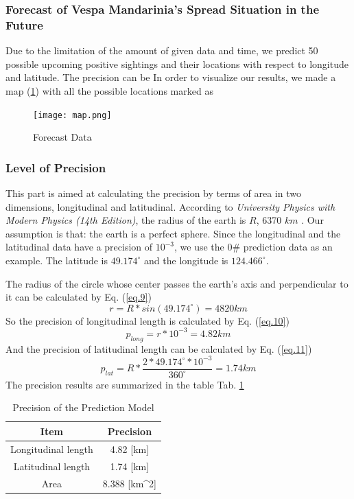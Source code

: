 \documentclass{mcmthesis}
\begin{document}
\subsubsection{Forecast of Vespa Mandarinia's Spread Situation in the Future}
Due to the limitation of the amount of given data and time, we predict 50 possible upcoming positive sightings and their locations with respect to longitude and latitude. The precision can be 
In order to visualize our results, we made a map (\ref{fig:map}) with all the possible locations marked as
\begin{figure}[!htbp]
	\centering
 	\texttt{[image: map.png]} 
	\caption{Forecast Data}
	\label{fig:map}
\end{figure}
\subsubsection{Level of Precision}
This part is aimed at calculating the precision by terms of area in two dimensions, longitudinal and latitudinal. According to \textit{University Physics with Modern Physics (14th Edition)}, the radius of the earth is $R$, 6370 $km$ \cite{RN2}. Our assumption is that: the earth is a perfect sphere. Since the longitudinal and the latitudinal data have a precision of $10^{-3}$, we use the 0\# prediction data as an example. The latitude is $49.174^\circ$ and the longitude is $124.466^\circ$. 

The radius of the circle whose center passes the earth's axis and perpendicular to it can be calculated by Eq. (\ref{eq.9})
\begin{equation}
	r=R*sin(49.174^\circ)=4820km
	\label{eq.9}
\end{equation}
So the precision of longitudinal length is calculated by Eq. (\ref{eq.10})
\begin{equation}
	p_{long}=r*10^{-3}=4.82km
	\label{eq.10}
\end{equation}
And the precision of latitudinal length can be calculated by Eq. (\ref{eq.11})
\begin{equation}
	p_{lat}=R*\frac{2*49.174^\circ*10^{-3}}{360^\circ}=1.74km
	\label{eq.11}
\end{equation}
The precision results are summarized in the table Tab. \ref{tab:3}
\begin{table}[htbp]
\centering
\begin{tabular}{cc}
\hline
Item & Precision\\
\hline
Longitudinal length & 4.82 [km]\\
Latitudinal length & 1.74 [km]\\
Area & 8.388 [km^{2}]\\

\hline
\end{tabular}
\caption{Precision of the Prediction Model}
\label{tab:3}
\end{table}
\end{document}
